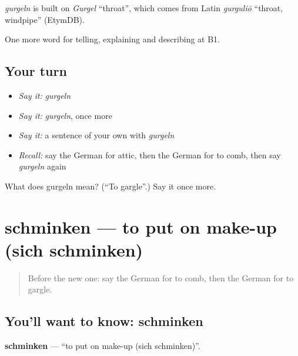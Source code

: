 \begin{cousinweb}
\emph{gurgeln} is built on \emph{Gurgel} \textquotedblleft{}throat\textquotedblright{}, which comes from Latin \emph{gurguliō} \textquotedblleft{}throat, windpipe\textquotedblright{} (EtymDB).
\end{cousinweb}

\begin{grammarlens}[title={What you've built}]
One more word for telling, explaining and describing at B1.
\end{grammarlens}

\subsection*{Your turn}
\begin{itemize}
\raggedright
  \item \emph{Say it:} \emph{gurgeln}
  \item \emph{Say it:} \emph{gurgeln}, once more
  \item \emph{Say it:} a sentence of your own with \emph{gurgeln}
  \item \emph{Recall:} say the German for attic, then the German for to comb, then say \emph{gurgeln} again
\end{itemize}

\begin{tcolorbox}[breakable,colback=teal!4,colframe=teal!35!black,title={Before you move on}]
What does gurgeln mean? (\textquotedblleft{}To gargle\textquotedblright{}.) Say it once more.
\end{tcolorbox}
\section[schminken]{schminken — to put on make-up (sich schminken)}

\label{lesson:GE-C530-schminken}



\begin{quote}
Before the new one: say the German for to comb, then the German for to gargle.
\end{quote}

\subsection*{You'll want to know: schminken}
\textbf{schminken} — \textquotedblleft{}to put on make-up (sich schminken)\textquotedblright{}.

